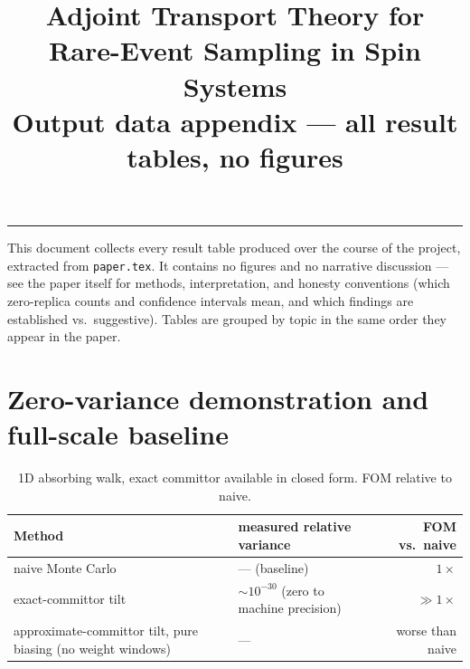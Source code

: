 \documentclass[11pt]{article}
\title{\vspace{-1.2cm}Adjoint Transport Theory for Rare-Event Sampling in Spin Systems\\[2pt]
	\large Output data appendix --- all result tables, no figures}
\author{}\date{}
\begin{document}
\maketitle
\vspace{-1.3cm}
\begin{center}\rule{0.62\textwidth}{0.4pt}\end{center}

\noindent This document collects every result table produced over the course of the
project, extracted from \texttt{paper.tex}. It contains no figures and no narrative
discussion --- see the paper itself for methods, interpretation, and honesty
conventions (which zero-replica counts and confidence intervals mean, and which
findings are established vs.\ suggestive). Tables are grouped by topic in the same
order they appear in the paper.

\section{Zero-variance demonstration and full-scale baseline}

\begin{table}[h]
	\centering\small
	\caption{1D absorbing walk, exact committor available in closed form. FOM relative to naive.}
	\label{tab:demo}
	\begin{tabular}{p{5.4cm}p{4.4cm}r}
		\toprule
		Method & measured relative variance & FOM vs.\ naive \\
		\midrule
		naive Monte Carlo & --- (baseline) & $1\times$ \\
		exact-committor tilt & $\sim10^{-30}$ (zero to machine precision) & $\gg1\times$ \\
		approximate-committor tilt, pure biasing (no weight windows) & --- & worse than naive \\
		\bottomrule
	\end{tabular}
\end{table}
\end{document}

